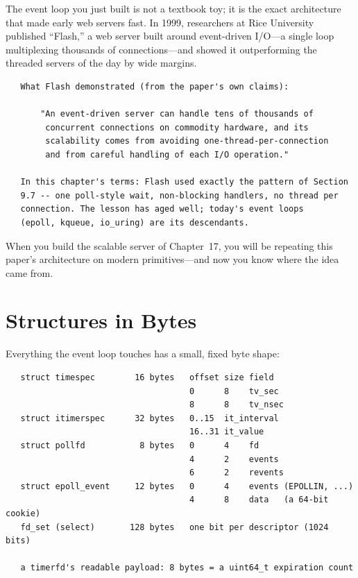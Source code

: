 \begin{researchnote}
The event loop you just built is not a textbook toy; it is the exact
architecture that made early web servers fast. In 1999, researchers at
Rice University published ``Flash,'' a web server built around
event-driven I/O---a single loop multiplexing thousands of
connections---and showed it outperforming the threaded servers of the
day by wide margins.

\begin{verbatim}
   What Flash demonstrated (from the paper's own claims):

       "An event-driven server can handle tens of thousands of
        concurrent connections on commodity hardware, and its
        scalability comes from avoiding one-thread-per-connection
        and from careful handling of each I/O operation."

   In this chapter's terms: Flash used exactly the pattern of Section
   9.7 -- one poll-style wait, non-blocking handlers, no thread per
   connection. The lesson has aged well; today's event loops
   (epoll, kqueue, io_uring) are its descendants.
\end{verbatim}

When you build the scalable server of Chapter~17, you will be
repeating this paper's architecture on modern primitives---and now you
know where the idea came from.

\end{researchnote}

\section{Structures in Bytes}

Everything the event loop touches has a small, fixed byte shape:

\begin{verbatim}
   struct timespec        16 bytes   offset size field
                                     0      8    tv_sec
                                     8      8    tv_nsec
   struct itimerspec      32 bytes   0..15  it_interval
                                     16..31 it_value
   struct pollfd           8 bytes   0      4    fd
                                     4      2    events
                                     6      2    revents
   struct epoll_event     12 bytes   0      4    events (EPOLLIN, ...)
                                     4      8    data   (a 64-bit cookie)
   fd_set (select)       128 bytes   one bit per descriptor (1024 bits)

   a timerfd's readable payload: 8 bytes = a uint64_t expiration count
\end{verbatim}

